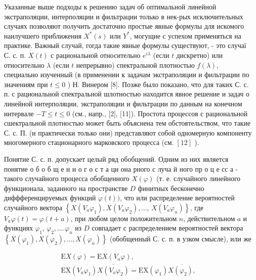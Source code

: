 \documentclass[10pt]{article}
\begin{document}
Указанные выше подходы к решению задач об оптимальной линейной экстраполяции, интерполяции и фильтрации только в нек-рых исключительных случаях позволяют получить достаточно простые явные формулы для искомого наилучшего приближения $X^{*}(s)$ или $Y^{*}$, могущие с успехом применяться на практике. Важный случай, гогда такие явные формулы существуют, - это случаї С. с. п. $X(t)$ с рациональной относительно $e^{i \lambda}$ (если $t$ дискретно) или относительно $\lambda$ (если $t$ непрерывно) спектральной плотностью $f(\lambda)$, специально изученный (в применении к задачам экстраполяции и фильтрации по значениям при $t \leqslant 0$ ) Н. Винером [8]. Позже было показано, что для таких С. с. п. с рациональной спектральной шлотностью находится явное решение и задач о линейной интерполяции, экстраполяции и фильтрации по данным на конечном интервале $-T \leqslant t \leqslant 0$ (см., напр., [2], [11]). Простота процессов с рациональной сшектральной плотностью может быть объяснена тем обстоятельством, что такие С. с. П. (и практически только они) представляют собой одномерную компоненту многомерного стационарного марковского процесса (см. $[12]$ ).



Понятие С. с. п. допускает целый ряд обобщений. Одним из них является понятие о б о б щ е н н о г о с т а ци она рного с луча й ного пр о ц е сс а - такого случайного процесса обобщенного $X(\varphi)$ (т. е. случайного линейного функционала, заданного на пространстве $D$ финитных бесконечно диффференцируемых функций $\varphi(t))$, что или распределение вероятностей случайного вектора $\left\{X\left(V_{a} \varphi_{1}\right), X\left(V_{a} \varphi_{2}\right), \ldots\right.$, $\left.X\left(V_{a} \varphi_{n}\right)\right\}$, где $V_{a} \varphi(t)=\varphi(t+a)$, при любом целом положительном $n$, действительном $a$ и функциях $\varphi_{1}$, $\varphi_{2}, \ldots . \varphi_{n}$ из $D$ совпадает с распределением вероятностей вектора $\left\{X\left(\varphi_{1}\right), X\left(\varphi_{2}\right), \ldots, X\left(\varphi_{n}\right)\right\}$ (обобщенный С. с. п. в узком смысле), или же



\[

\begin{gathered}

\mathrm{E} X(\varphi)=\mathrm{E} X\left(V_{a} \varphi\right), \\

\mathrm{EX}\left(V_{a} \varphi_{1}\right) \overline{X\left(V_{a} \varphi_{2}\right)}=\mathrm{EX}\left(\varphi_{1}\right) \overline{X\left(\varphi_{2}\right),}

\end{gathered}

\]
\end{document}
